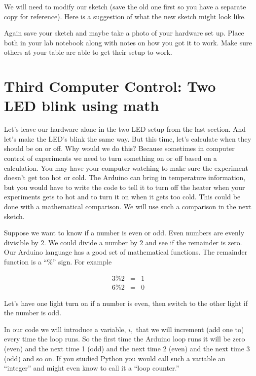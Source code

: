 We will need to modify our sketch (save the old one first so you have a separate copy for reference). Here is a suggestion of what the new sketch might look like.




Again save your sketch and maybe take a photo of your hardware set up. Place both in your lab notebook along with notes on how you got it to work. Make sure others at your table are able to get their setup to work. 

\section{Third Computer Control: Two LED blink using math}

Let's leave our hardware alone in the two LED setup from the last section. And let's make the LED's blink the same way. But this time, let's calculate when they should be on or off. Why would we do this? Because sometimes in computer control of experiments we need to turn something on or off based on a calculation. You may have your computer watching to make sure the experiment doesn't get too hot or cold. The Arduino can bring in temperature information, but you would have to write the code to tell it to turn off the heater when your experiments gets to hot and to turn it on when it gets too cold. This could be done with a mathematical comparison. We will use such a comparison in the next sketch.

Suppose we want to know if a number is even or odd. Even numbers are evenly divisible by $2.$ We could divide a number by $2$ and see if the remainder is zero. Our Arduino language has a good set of mathematical functions. The remainder function is a ``\%'' sign. For example 

\begin{eqnarray*}
	3\%2 &=&1 \\
	6\%2 &=&0
\end{eqnarray*}

Let's have one light turn on if a number is even, then switch to the other light if the number is odd.

In our code we will introduce a variable, $i,$ that we will increment (add one to) every time the loop runs. So the first time the Arduino loop runs it will be zero (even) and the next time 1 (odd) and the next time 2 (even) and the next time 3 (odd) and so on. If you studied Python you would call such a variable an ``integer'' and might even know to call it a ``loop counter.'' 

